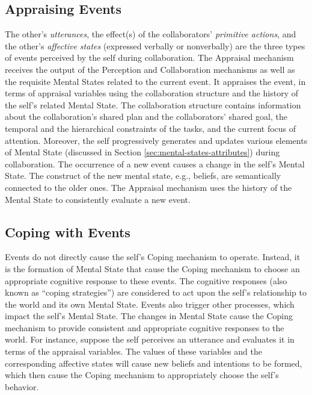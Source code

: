 \documentclass[12pt]{report}
\begin{document}
\subsection{Appraising Events}
\label{sec:appraisal-event}

The other's \textit{utterances}, the effect(s) of the collaborators'
\textit{primitive actions}, and the other's \textit{affective states}
(expressed verbally or nonverbally) are the three types of events perceived by
the self during collaboration. The Appraisal mechanism receives the output of
the Perception and Collaboration mechanisms as well as the requisite Mental
States related to the current event. It appraises the event, in terms of
appraisal variables using the collaboration structure and the history of the
self's related Mental State. The collaboration structure contains information
about the collaboration's shared plan and the collaborators' shared goal, the
temporal and the hierarchical constraints of the tasks, and the current focus of
attention. Moreover, the self progressively generates and updates various
elements of Mental State (discussed in Section
\ref{sec:mental-states-attributes}) during collaboration. The occurrence of a
new event causes a change in the self's Mental State. The construct of the new
mental state, e.g., beliefs, are semantically connected to the older ones. The
Appraisal mechanism uses the history of the Mental State to consistently
evaluate a new event.

\subsection{Coping with Events}

Events do not directly cause the self's Coping mechanism to operate. Instead, it
is the formation of Mental State that cause the Coping mechanism to choose an
appropriate cognitive response to these events. The cognitive responses (also
known as ``coping strategies'') are considered to act upon the self's
relationship to the world and its own Mental State. Events also trigger other
processes, which impact the self's Mental State. The changes in Mental State
cause the Coping mechanism to provide consistent and appropriate cognitive
responses to the world. For instance, suppose the self perceives an utterance
and evaluates it in terms of the appraisal variables. The values of these
variables and the corresponding affective states will cause new beliefs and
intentions to be formed, which then cause the Coping mechanism to appropriately
choose the self's behavior.
\end{document}

